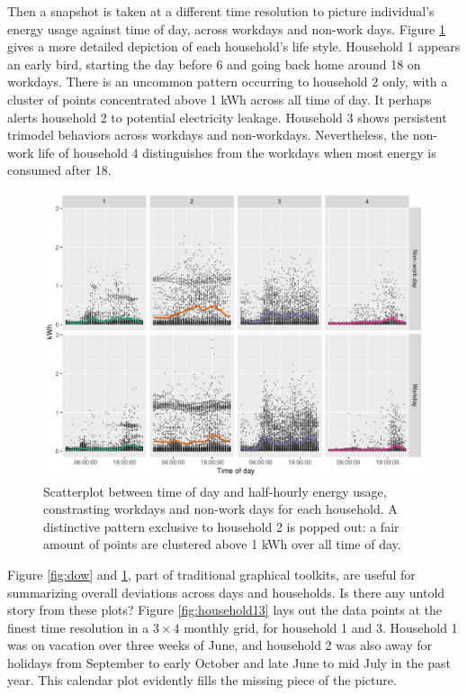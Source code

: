 \documentclass[12pt]{article}
\begin{document}
Then a snapshot is taken at a different time resolution to picture
individual's energy usage against time of day, across workdays and
non-work days. Figure \ref{fig:hod} gives a more detailed depiction of
each household's life style. Household 1 appears an early bird, starting
the day before 6 and going back home around 18 on workdays. There is an
uncommon pattern occurring to household 2 only, with a cluster of points
concentrated above 1 kWh across all time of day. It perhaps alerts
household 2 to potential electricity leakage. Household 3 shows
persistent trimodel behaviors across workdays and non-workdays.
Nevertheless, the non-work life of household 4 distinguishes from the
workdays when most energy is consumed after 18.

\begin{figure}

{\centering \includegraphics[width=\textwidth]{figure/hod-1} 

}

\caption{Scatterplot between time of day and half-hourly energy usage, constrasting workdays and non-work days for each household. A distinctive pattern exclusive to household 2 is popped out: a fair amount of points are clustered above 1 kWh over all time of day.}\label{fig:hod}
\end{figure}

Figure \ref{fig:dow} and \ref{fig:hod}, part of traditional graphical
toolkits, are useful for summarizing overall deviations across days and
households. Is there any untold story from these plots? Figure
\ref{fig:household13} lays out the data points at the finest time
resolution in a \(3 \times 4\) monthly grid, for household 1 and 3.
Household 1 was on vacation over three weeks of June, and household 2
was also away for holidays from September to early October and late June
to mid July in the past year. This calendar plot evidently fills the
missing piece of the picture.
\end{document}
